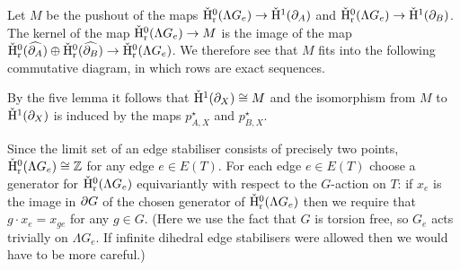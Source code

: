Let $M$ be the pushout of the maps $\check{\mathrm{H}}{}^0_{\mathrm{r}}(\Lambda G_e) \to \check{\mathrm{H}}{}^1(\partial_A)$ and $\check{\mathrm{H}}{}^0_{\mathrm{r}}(\Lambda G_e) \to \check{\mathrm{H}}{}^1(\partial_B)$.
The kernel of the map $\check{\mathrm{H}}{}^0_{\mathrm{r}}(\Lambda G_e) \to M$ is the image of the map $\check{\mathrm{H}}{}^0_{\mathrm{r}}(\widehat{\partial_A}) \oplus \check{\mathrm{H}}{}^0_{\mathrm{r}}(\widehat{\partial_B}) \to \check{\mathrm{H}}{}^0_{\mathrm{r}}(\Lambda G_e)$.
We therefore see that $M$ fits into the following commutative diagram, in which rows are exact sequences.
\begin{center}
\end{center}

By the five lemma it follows that $\check{\mathrm{H}}{}^1(\partial_X) \cong M$ and the isomorphism from $M$ to $\check{\mathrm{H}}{}^1(\partial_X)$ is induced by the maps $p_{A,X}^\star$ and $p_{B,X}^\star$.

Since the limit set of an edge stabiliser consists of precisely two points, $\check{\mathrm{H}}{}^0_{\mathrm{r}}(\Lambda G_e) \cong \mathbb{Z}$ for any edge $e \in E(T)$.
For each edge $e \in E(T)$ choose a generator for $\check{\mathrm{H}}{}^0_{\mathrm{r}}(\Lambda G_e)$ equivariantly with respect to the $G$-action on $T$: if $x_e$ is the image in $\partial G$ of the chosen generator of $\check{\mathrm{H}}{}^0_{\mathrm{r}}(\Lambda G_e)$ then we require that $g\cdot x_e = x_{ge}$ for any $g \in G$.
(Here we use the fact that $G$ is torsion free, so $G_e$ acts trivially on $\Lambda G_e$. If infinite dihedral edge stabilisers were allowed then we would have to be more careful.)

